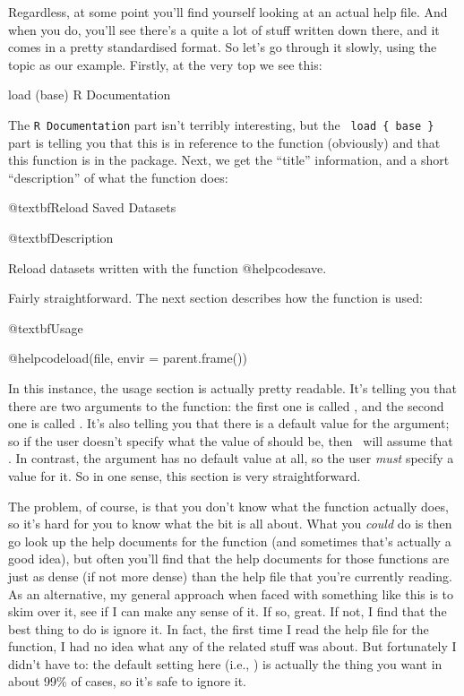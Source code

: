 Regardless, at some point you'll find yourself looking at an actual help file. And when you do, you'll see there's a quite a lot of stuff written down there, and it comes in a pretty standardised format. So let's go through it slowly, using the  topic as our example. Firstly, at the very top we see this:
\begin{rhelp}
load (base)	                                              R Documentation
\end{rhelp}
The \texttt{R Documentation} part isn't terribly interesting, but the \texttt{ load \{ base \} } part is telling you that this is in reference to the  function (obviously) and that this function is in the  package. Next, we get the ``title'' information, and a short ``description'' of what the function does:
\begin{rhelp1}

                             @textbf{Reload Saved Datasets}

@textbf{Description}

Reload datasets written with the function @helpcode{save}.

\end{rhelp1}
Fairly straightforward. The next section describes how the function is used:

\begin{rhelp1}

@textbf{Usage}

@helpcode{load(file, envir = parent.frame())}

\end{rhelp1}
In this instance, the usage section is actually pretty readable. It's telling you that there are two arguments to the  function: the first one is called , and the second one is called . It's also telling you that there is a default value for the  argument; so if the user doesn't specify what the value of  should be, then \R\ will assume that . In contrast, the  argument has no default value at all, so the user {\it must} specify a value for it. So in one sense, this section is very straightforward. 

The problem, of course, is that you don't know what the  function actually does, so it's hard for you to know what the  bit is all about. What you {\it could} do is then go look up the help documents for the  function (and sometimes that's actually a good idea), but often you'll find that the help documents for those functions are just as dense (if not more dense) than the help file that you're currently reading. As an alternative, my general approach when faced with something like this is to skim over it, see if I can make any sense of it. If so, great. If not, I find that the best thing to do is ignore it. In fact, the first time I read the help file for the  function, I had no idea what any of the  related stuff was about. But fortunately I didn't have to: the default setting here (i.e.,   ) is actually the thing you want in about 99\% of cases, so it's safe to ignore it. 

